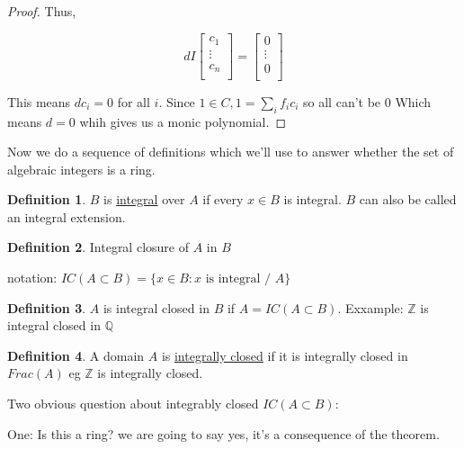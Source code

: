 \documentclass{article}
\theoremstyle{definition}
\newtheorem{definition}{Definition}
\begin{document}
\begin{proof}
    Thus,

    \[
        dI \begin{bmatrix}
             c_1 \\
             \vdots \\
             c_n \\
        \end{bmatrix} = \begin{bmatrix}
             0 \\
             \vdots \\
             0 \\
        \end{bmatrix}
    \]

    This means \(dc_i = 0\) for all \(i\). Since \(1\in C, 1 = \sum_{i} f_i c_i\) so all can't be \(0\) Which means \(d = 0\) whih gives us a monic polynomial.

\end{proof}

Now we do a sequence of definitions which we'll use to answer whether the set of algebraic integers is a ring.

\begin{definition}
    \(B\) is \underline{integral} over \(A\) if every \(x\in B\) is integral. \(B\) can also be called an integral extension.
\end{definition}

\begin{definition}
    Integral closure of \(A\) in \(B\) 

    notation: \(IC (A \subset B) = \{ x\in B : x \text{ is integral / } A \} \) 

\end{definition}

\begin{definition}
    \(A\) is integral closed in \(B\) if \(A = IC (A \subset B)\). Exxample: \(\mathbb{Z}\) is integral closed in \(\mathbb{Q}\) 
\end{definition}

\begin{definition}
    A domain \(A\) is \underline{integrally closed} if it is integrally closed in \(Frac(A)\) eg \(\mathbb{Z}\) is integrally closed.
\end{definition}

Two obvious question about integrably closed \(IC(A \subset B)\):

One: Is this a ring? we are going to say yes, it's a consequence of the theorem.
\end{document}

